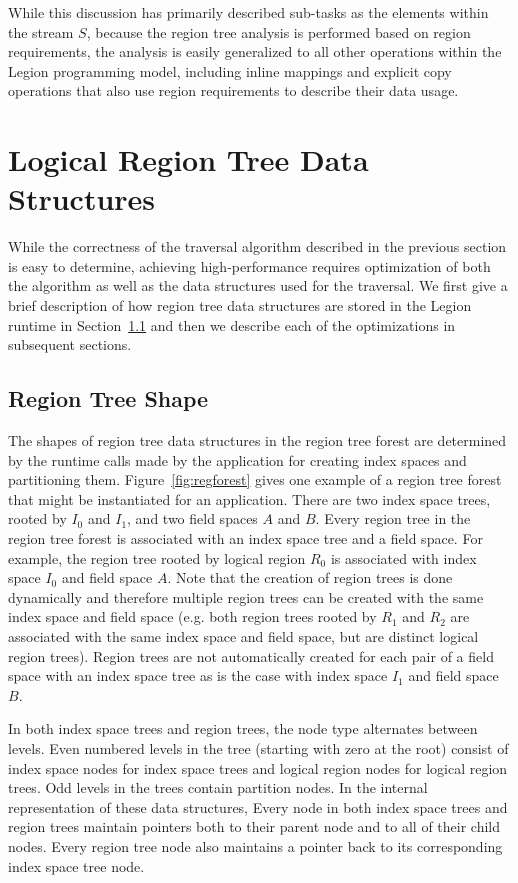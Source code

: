 While this discussion has primarily described 
sub-tasks as the elements within the stream $S$,
because the region tree analysis is performed
based on region requirements, the analysis is
easily generalized to all other operations within
the Legion programming model, including inline
mappings and explicit copy operations that also
use region requirements to describe their data usage.

\section{Logical Region Tree Data Structures}
\label{sec:logicaltree}
While the correctness of the traversal algorithm
described in the previous section is easy to
determine, achieving high-performance requires
optimization of both the algorithm as well as the data
structures used for the traversal. We first give 
a brief description of how region tree data structures 
are stored in the Legion runtime in 
Section~\ref{subsec:logicalshape} and then we describe 
each of the optimizations in subsequent sections.

\subsection{Region Tree Shape}
\label{subsec:logicalshape}
The shapes of region tree data structures in the
region tree forest are determined by the runtime calls 
made by the application for creating index spaces and 
partitioning them. Figure~\ref{fig:regforest} gives one 
example of a region tree forest that might be instantiated 
for an application.  There are two index space trees,
rooted by $I_0$ and $I_1$, and two field spaces
$A$ and $B$.  Every region tree in the region tree
forest is associated with an index space tree
and a field space. For example, the region tree
rooted by logical region $R_0$ is associated with
index space $I_0$ and field space $A$. Note that 
the creation of region trees is done dynamically
and therefore multiple region trees can be created
with the same index space and field space (e.g.
both region trees rooted by $R_1$ and $R_2$ are
associated with the same index space and field
space, but are distinct logical region trees). Region 
trees are not automatically created
for each pair of a field space with an index space
tree as is the case with index space $I_1$ and field
space $B$.

In both index space trees and region trees, the
node type alternates between levels.
Even numbered levels in the tree (starting with 
zero at the root) consist of index space nodes 
for index space trees and logical region nodes for
logical region trees. Odd levels in the trees
contain partition nodes. In the internal representation
of these data structures, Every node in both index space 
trees and region trees maintain pointers both to their 
parent node and to all of their child nodes. Every region 
tree node also maintains a pointer back to its corresponding 
index space tree node.

